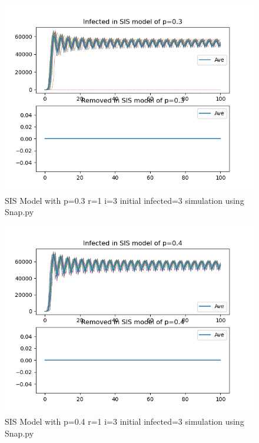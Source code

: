 \documentclass{subfile}
\begin{document}
  \begin{figure}
  \includegraphics[scale=0.8]{sisp03r1i3s3}
  \caption[SIS p=0.3,r=1,i=3,init infected=3]{SIS Model with p=0.3 r=1 i=3 initial infected=3 simulation using Snap.py}
  \end{figure}
  \begin{figure}
  \includegraphics[scale=0.8]{sisp04r1i3s3}
  \caption[SIS p=0.4,r=1,i=3,init infected=3]{SIS Model with p=0.4 r=1 i=3 initial infected=3 simulation using Snap.py}
  \end{figure}
\end{document}
